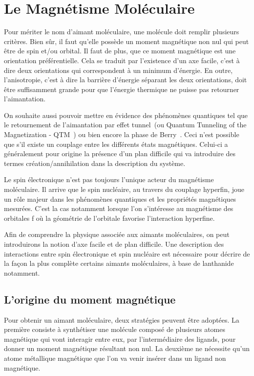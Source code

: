 \chapter{Le Magnétisme Moléculaire}

Pour mériter le nom d'aimant moléculaire, une molécule doit remplir plusieurs critères. Bien s\^ur, il faut qu'elle possède un moment magnétique non nul qui peut \^etre de spin et/ou orbital. Il faut de plus, que ce moment magnétique est une orientation préférentielle. Cela se traduit par l'existence d'un axe facile, c'est à dire deux orientations qui correspondent à un minimum d'énergie. En outre, l'anisotropie, c'est à dire la barrière d'énergie séparant les deux orientations, doit \^etre suffisamment grande pour que l'énergie thermique ne puisse pas retourner l'aimantation.

On souhaite aussi pouvoir mettre en évidence des phénomènes quantiques tel que le retournement de l'aimantation par effet tunnel~(ou Quantum Tunneling of the Magnetization - QTM~\cite{Thomas1996,Friedman1996}) ou bien encore la phase de Berry~\cite{Wernsdorfer1999}. Ceci n'est possible que s'il existe un couplage entre les différents états magnétiques. Celui-ci a généralement pour origine la présence d'un plan difficile qui va introduire des termes création/annihilation dans la description du système.

Le spin électronique n'est pas toujours l'unique acteur du magnétisme moléculaire. Il arrive que le spin nucléaire, au travers du couplage hyperfin, joue un r\^ole majeur dans les phénomènes quantiques et les propriétés magnétiques mesurées. C'est la cas notamment lorsque l'on s'intéresse au magnétisme des orbitales f où la géométrie de l'orbitale favorise l'interaction hyperfine.

Afin de comprendre la physique associée aux aimants moléculaires, on peut introduirons la notion d'axe facile et de plan difficile. Une description des interactions entre spin électronique et spin nucléaire est nécessaire pour décrire de la façon la plus complète certains aimants moléculaires, à base de lanthanide notamment.

\section{L'origine du moment magnétique}
Pour obtenir un aimant moléculaire, deux stratégies peuvent être adoptées. La première consiste à synthétiser une molécule composé de plusieurs atomes magnétique qui vont interagir entre eux, par l'intermédiaire des ligands, pour donner un moment magnétique résultant non nul. La deuxième ne nécessite qu'un atome métallique magnétique que l'on va venir insérer dans un ligand non magnétique.

